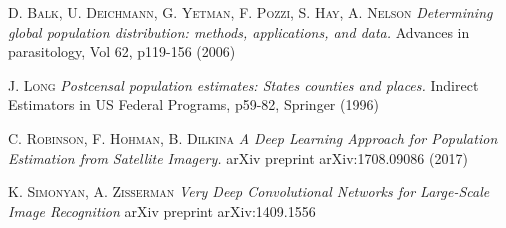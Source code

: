 \documentclass{article}
\begin{document}
\begin{thebibliography}{9}

 \textsc{D. Balk, U. Deichmann, G. Yetman, F. Pozzi, S. Hay, A. Nelson} \textit{ Determining global population distribution: methods, applications, and data.} Advances in parasitology, Vol 62, p119-156 (2006)

 \textsc{J. Long}\textit{ Postcensal population estimates: States counties and places.} Indirect Estimators in US Federal Programs, p59-82, Springer (1996)

  \textsc{C. Robinson, F. Hohman, B. Dilkina}\textit{ A Deep Learning Approach for Population Estimation from Satellite Imagery.} arXiv preprint arXiv:1708.09086 (2017)

 \textsc{K. Simonyan, A. Zisserman} \textit{ Very Deep Convolutional Networks for Large-Scale Image Recognition} arXiv preprint arXiv:1409.1556
\end{thebibliography}
\end{document}
